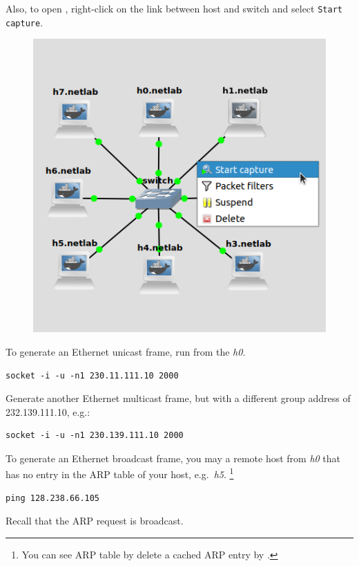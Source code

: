 \documentclass{../UTNetLab}
\begin{document}
Also, to open , right-click on the link between host and switch and select \texttt{Start capture}.
\begin{figure}[H]
    \centering
    \includegraphics[scale=1.8]{img/capture}
\end{figure}

To generate an Ethernet unicast frame, run  from the \textit{h0}.

\begin{lstlisting}[emph={your-host, remote-host}]
socket -i -u -n1 230.11.111.10 2000
\end{lstlisting}

Generate another Ethernet multicast frame, but with a different group address of {232.139.111.10}, e.g.:

\begin{lstlisting}[emph={your-host, remote-host}]
socket -i -u -n1 230.139.111.10 2000
\end{lstlisting}


To generate an Ethernet broadcast frame, you may  a remote host from \textit{h0} that has no entry in the ARP table of your host, e.g.\ \textit{h5}.
\footnote{You can see ARP table by  delete a cached ARP entry by .}

\begin{lstlisting}
ping 128.238.66.105
\end{lstlisting}
Recall that the ARP request is broadcast.%
\end{document}
